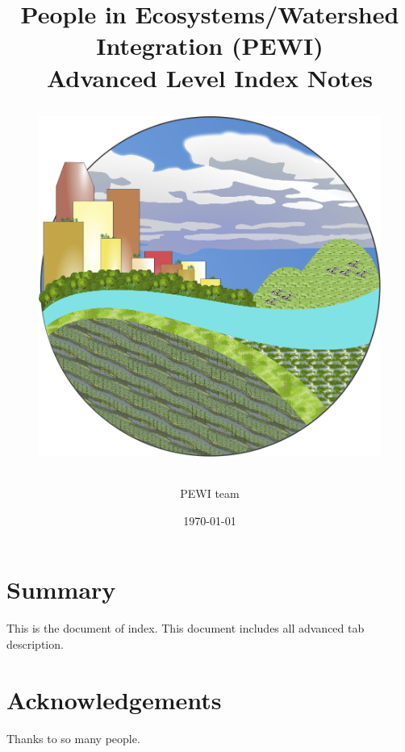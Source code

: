 \documentclass[11pt]{article}
\begin{document}
\begin{titlepage}
\title{
	{\large People in Ecosystems/Watershed Integration (PEWI)}\\
	{\huge {Advanced Level Index Notes\\}}
	\begin{figure}[H]
	\centering
	\includegraphics[height=3 in]{../imgs/updatedPewiLogo.png}
	\end{figure}
}
\author{PEWI team}
\date {\today} %
\maketitle
\thispagestyle{empty} %
\end{titlepage}

\section*{Summary}
This is the document of index. This document includes all advanced tab description.
\cleardoublepage

\section*{Acknowledgements}
Thanks to so many people.
\cleardoublepage


\tableofcontents
\thispagestyle{empty} %
\cleardoublepage %

\setcounter{page}{1}
\end{document}
